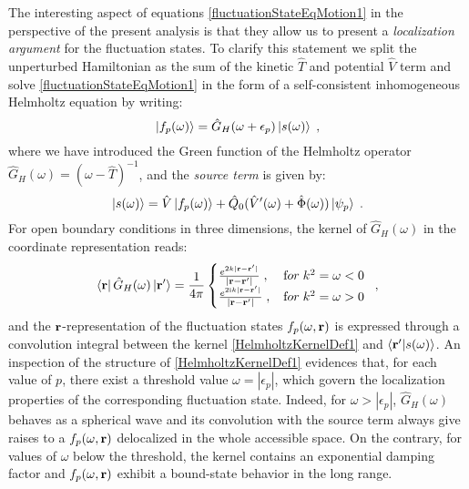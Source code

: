 \documentclass[reprint,aps,prb]{revtex4-1}
\renewcommand{\r}{{\bf r}}
\newcommand{\eps}{\epsilon}
\newcommand{\ii}{\mathrm{i}}
\newcommand{\be}{\begin{equation}}
\newcommand{\ee}{\end{equation}}
\newcommand{\nn}{\notag}
\newcommand{\lb}{\label}
\newcommand{\op}[1]{\hat {#1}}
\newcommand{\brket}[2]{\langle  #1 | #2 \rangle} %
\begin{document}
The interesting aspect of equations \eqref{fluctuationStateEqMotion1} in the perspective of the present analysis is that they allow us to present a \emph{localization argument} 
for the fluctuation states. To clarify this statement we split the unperturbed Hamiltonian as the sum of the kinetic $\op T$ and potential $\op V$ term and solve \eqref{fluctuationStateEqMotion1} 
in the form of a self-consistent inhomogeneous Helmholtz equation by writing:
\be
\ket{f_p(\omega)} = \op G_H(\omega+\epsilon_p)\ket{s(\omega)} \;,
\ee
where we have introduced the Green function of the Helmholtz operator $\op G_H(\omega) = (\omega-\op T)^{-1}$, %
and the \emph{source term} is given by:
\be
\ket{s(\omega)} =  \op V\ket{f_p(\omega)} + \op Q_0(\op V'(\omega) + \op \Phi(\omega))\ket{\psi_p} \;.\nn
\ee
For open boundary conditions in three dimensions, the kernel of $\op G_H(\omega)$ in the coordinate representation reads: 
\be\lb{HelmholtzKernelDef1}
\bra{\r} \op G_H(\omega) \ket{\r'} = \frac{1}{4\pi} \begin{cases}
\frac{e^{2k|\r - \r' |}}{|\r- \r' |} \;,\; & {\textrm for}\; k^2 = \omega  < 0\; \\ 
\frac{e^{2\ii k |\r-\r' |}}{|\r-\r' |} \;, & {\textrm for} \; k^2 = \omega > 0
\end{cases} \;,
\ee
and the $\r$-representation of the fluctuation states $f_p(\omega,\r)$ is expressed through a convolution integral between the kernel \eqref{HelmholtzKernelDef1} and
$\brket{\r'}{s(\omega)}$.
An inspection of the structure of \eqref{HelmholtzKernelDef1} evidences that, for each value of $p$, there exist a threshold value $\omega = |\eps_p|$, 
which govern the localization properties of the corresponding fluctuation state. Indeed, for $\omega > |\eps_p|$,  $\op G_H(\omega)$ behaves as a spherical wave and its
convolution with the source term always give raises to a $f_p(\omega,\r)$ delocalized in the whole accessible space. On the contrary, for values of $\omega$ below the threshold,
the kernel contains an exponential damping factor and $f_p(\omega,\r)$ exhibit a bound-state behavior in the long range.   
\end{document}
